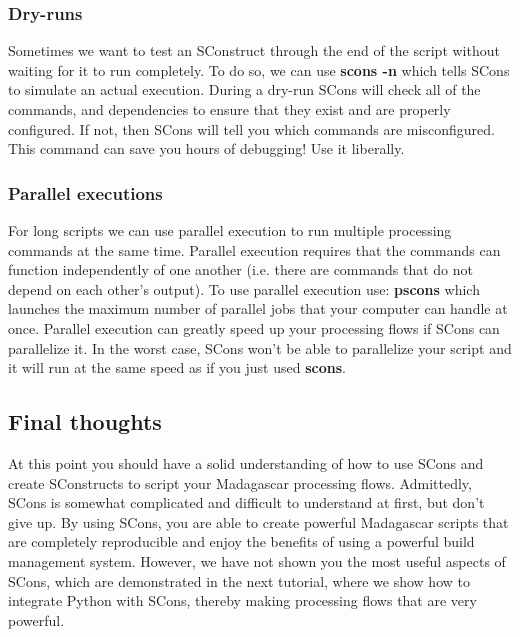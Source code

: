 \subsubsection{Dry-runs}

Sometimes we want to test an SConstruct through the end of the script without waiting for it to run completely.  To do so, we can use \textbf{scons -n} which tells SCons to simulate an actual execution. During a dry-run SCons will check all of the commands, and dependencies to ensure that they exist and are properly configured.  If not, then SCons will tell you which commands are misconfigured.  This command can save you hours of debugging!  Use it liberally.

\subsubsection{Parallel executions}

For long scripts we can use parallel execution to run multiple processing commands at the same time.  Parallel execution requires that the commands can function independently of one another (i.e. there are commands that do not depend on each other's output).  To use parallel execution use: \textbf{pscons} which launches the maximum number of parallel jobs that your computer can handle at once.  Parallel execution can greatly speed up your processing flows if SCons can parallelize it.  In the worst case, SCons won't be able to parallelize your script and it will run at the same speed as if you just used \textbf{scons}.

\subsection{Final thoughts}

At this point you should have a solid understanding of how to use SCons and create SConstructs to script your Madagascar processing flows.  Admittedly, SCons is somewhat complicated and difficult to understand at first, but don't give up.  By using SCons, you are able to create powerful Madagascar scripts that are completely reproducible and enjoy the benefits of using a powerful build management system.  However, we have not shown you the most useful aspects of SCons, which are demonstrated in the next tutorial, where we show how to integrate Python with SCons, thereby making processing flows that are very powerful.
 
